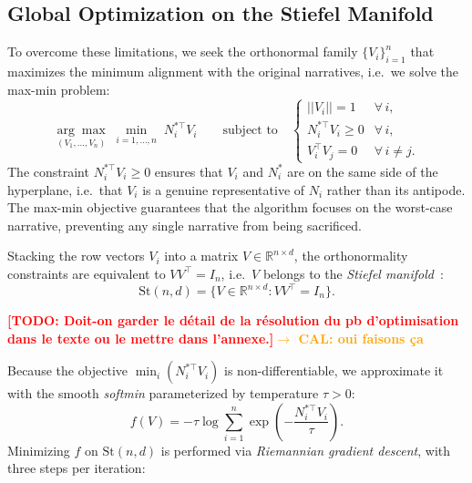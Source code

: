 \documentclass[
  journal=medium,
  manuscript=article-type,
  year=2025,
  volume=1,
]{cup-journal}
\newcommand{\R}{\mathbb{R}}
\newcommand{\St}{\mathrm{St}}
\newcommand{\TODO}[1]{\textcolor{red}{\textbf{[TODO: #1]}}}
\begin{document}
\subsection{Global Optimization on the Stiefel Manifold}
\label{sec:ortho:stiefel}

To overcome these limitations, we seek the orthonormal family
$\{V_i\}_{i=1}^{n}$ that maximizes the minimum alignment with the original narratives,
i.e.\ we solve the max-min problem:
\begin{equation}
    \label{eq:maxmin}
    \underset{(V_1,\ldots,V_n)}{\arg\max}\;
    \min_{i=1,\ldots,n}\; N_i^{*\top} V_i
    \qquad
    \text{subject to}
    \quad
    \begin{cases}
        ||V_i|| = 1 & \forall\, i,\\
        N_i^{*\top} V_i \geq 0 & \forall\, i,\\
        V_i^\top V_j = 0 & \forall\, i \neq j.
    \end{cases}
\end{equation}
The constraint $N_i^{*\top} V_i \geq 0$ ensures that $V_i$ and $N_i^*$
are on the same side of the hyperplane, i.e.\ that $V_i$ is a genuine representative
of $N_i$ rather than its antipode.
The max-min objective guarantees that the algorithm focuses on the worst-case
narrative, preventing any single narrative from being sacrificed.

Stacking the row vectors $V_i$ into a matrix $V \in \R^{n \times d}$,
the orthonormality constraints are equivalent to $V V^\top = I_n$,
i.e.\ $V$ belongs to the \emph{Stiefel manifold}~\autocite{boumal2023optimization,wen2013feasible}:
\begin{equation}
    \St(n,d) = \bigl\{V \in \R^{n \times d} : V V^\top = I_n\bigr\}.
\end{equation}

\TODO{Doit-on garder le détail de la résolution du pb d'optimisation dans le texte ou le mettre dans l'annexe.}\textcolor{Orange}{\bf $\to$ CAL: oui faisons ça}

Because the objective $\min_i(N_i^{*\top} V_i)$ is non-differentiable,
we approximate it with the smooth \emph{softmin} parameterized by temperature $\tau > 0$:
\begin{equation}
    \label{eq:softmin}
    f(V) = -\tau \log \sum_{i=1}^{n} \exp\!\left(-\frac{N_i^{*\top} V_i}{\tau}\right).
\end{equation}
Minimizing $f$ on $\St(n,d)$ is performed via \emph{Riemannian gradient descent},
with three steps per iteration:
\end{document}
